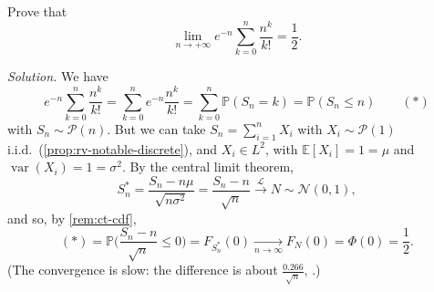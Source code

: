 \begin{example}\label{exa:ct-poisson-sum}
Prove that
\[
  \lim_{n\to+\infty}e^{-n}\sum_{k=0}^n\frac{n^k}{k!}=\frac12 .
\]

\emph{Solution.} We have
\[
  e^{-n}\sum_{k=0}^n\frac{n^k}{k!}=\sum_{k=0}^ne^{-n}\frac{n^k}{k!}=\sum_{k=0}^n\mathbb P(S_n=k)
  =\mathbb P(S_n\le n)\qquad(\ast)
\]
with $S_n\sim\mathcal P(n)$. But we can take $S_n=\sum_{i=1}^nX_i$ with $X_i\sim\mathcal P(1)$
i.i.d.\ (\cref{prop:rv-notable-discrete}), and $X_i\in L^2$, with $\mathbb E[X_i]=1=\mu$ and
$\operatorname{var}(X_i)=1=\sigma^2$. By the central limit theorem,
\[
  S_n^*=\frac{S_n-n\mu}{\sqrt{n\sigma^2}}=\frac{S_n-n}{\sqrt n}\xrightarrow{\mathcal L}N\sim\mathcal N(0,1),
\]
and so, by \cref{rem:ct-cdf},
\[
  (\ast)=\mathbb P\Big(\frac{S_n-n}{\sqrt n}\le0\Big)=F_{S_n^*}(0)\xrightarrow[n\to\infty]{}F_N(0)=\Phi(0)=\frac12 .
\]
(The convergence is slow: the difference is about $\frac{0.266}{\sqrt n}$, .)
\end{example}


